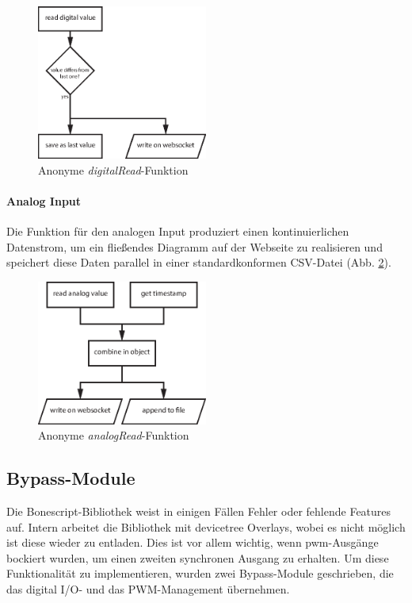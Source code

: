 \begin{figure}[ht]
\centering
\includegraphics[width = 0.5\textwidth]{documentation/images/wssTimerDigital.eps}
\caption{Anonyme \textit{digitalRead}-Funktion}
\label{fig:wssTimerDigital}
\end{figure}

\paragraph{Analog Input} Die Funktion für den analogen Input produziert einen kontinuierlichen Datenstrom, um ein fließendes Diagramm auf der Webseite zu realisieren und speichert diese Daten parallel in einer standardkonformen CSV-Datei \cite{rfc4180} (Abb. \ref{fig:wssTimerAnalog}).

\begin{figure}[ht]
\centering
\includegraphics[width = 0.5\textwidth]{documentation/images/wssTimerAnalog.eps}
\caption{Anonyme \textit{analogRead}-Funktion}
\label{fig:wssTimerAnalog}
\end{figure}

\subsection{Bypass-Module}
Die Bonescript-Bibliothek weist in einigen Fällen Fehler oder fehlende Features auf. Intern arbeitet die Bibliothek mit \gls{devicetree} Overlays, wobei es nicht möglich ist diese wieder zu entladen. Dies ist vor allem wichtig, wenn \gls{pwm}-Ausgänge bockiert wurden, um einen zweiten synchronen Ausgang zu erhalten. Um diese Funktionalität zu implementieren, wurden zwei Bypass-Module geschrieben, die das digital I/O- und das PWM-Management übernehmen.

